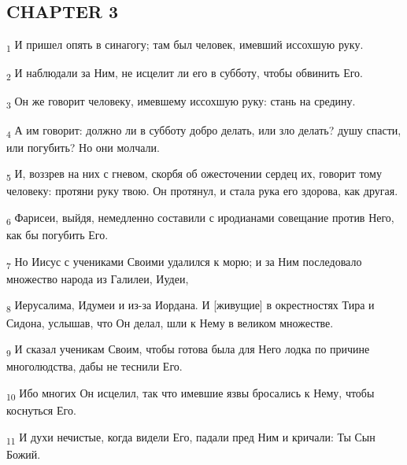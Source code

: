 \subsection{CHAPTER 3}
\begin{tcolorbox}
\textsubscript{1} И пришел опять в синагогу; там был человек, имевший иссохшую руку.
\end{tcolorbox}
\begin{tcolorbox}
\textsubscript{2} И наблюдали за Ним, не исцелит ли его в субботу, чтобы обвинить Его.
\end{tcolorbox}
\begin{tcolorbox}
\textsubscript{3} Он же говорит человеку, имевшему иссохшую руку: стань на средину.
\end{tcolorbox}
\begin{tcolorbox}
\textsubscript{4} А им говорит: должно ли в субботу добро делать, или зло делать? душу спасти, или погубить? Но они молчали.
\end{tcolorbox}
\begin{tcolorbox}
\textsubscript{5} И, воззрев на них с гневом, скорбя об ожесточении сердец их, говорит тому человеку: протяни руку твою. Он протянул, и стала рука его здорова, как другая.
\end{tcolorbox}
\begin{tcolorbox}
\textsubscript{6} Фарисеи, выйдя, немедленно составили с иродианами совещание против Него, как бы погубить Его.
\end{tcolorbox}
\begin{tcolorbox}
\textsubscript{7} Но Иисус с учениками Своими удалился к морю; и за Ним последовало множество народа из Галилеи, Иудеи,
\end{tcolorbox}
\begin{tcolorbox}
\textsubscript{8} Иерусалима, Идумеи и из-за Иордана. И [живущие] в окрестностях Тира и Сидона, услышав, что Он делал, шли к Нему в великом множестве.
\end{tcolorbox}
\begin{tcolorbox}
\textsubscript{9} И сказал ученикам Своим, чтобы готова была для Него лодка по причине многолюдства, дабы не теснили Его.
\end{tcolorbox}
\begin{tcolorbox}
\textsubscript{10} Ибо многих Он исцелил, так что имевшие язвы бросались к Нему, чтобы коснуться Его.
\end{tcolorbox}
\begin{tcolorbox}
\textsubscript{11} И духи нечистые, когда видели Его, падали пред Ним и кричали: Ты Сын Божий.
\end{tcolorbox}
